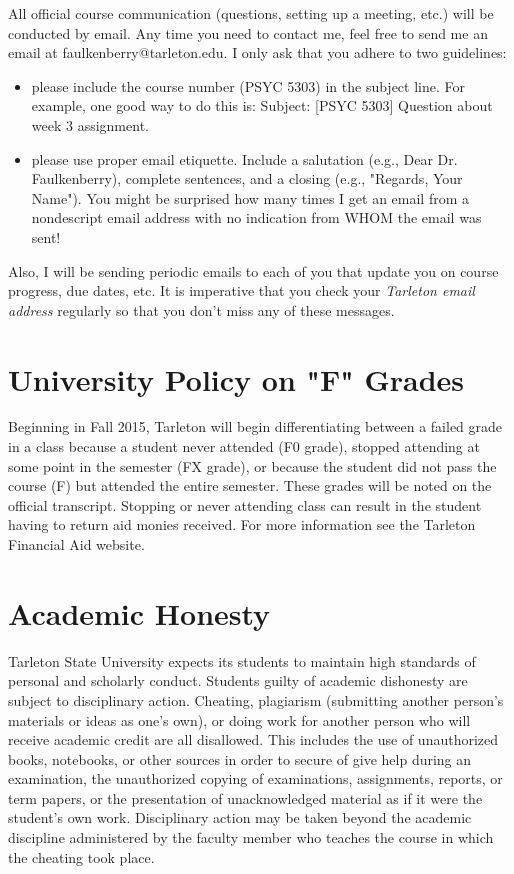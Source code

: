 \documentclass[10pt]{article}
\begin{document}
All official course communication (questions, setting up a meeting, etc.) will be conducted by email.  Any time you need to contact me, feel free to send me an email at faulkenberry@tarleton.edu.  I only ask that you adhere to two guidelines:
\begin{itemize}
\item please include the course number (PSYC 5303) in the subject line.  For example, one good way to do this is:  Subject: [PSYC 5303] Question about week 3 assignment.
\item please use proper email etiquette.  Include a salutation (e.g., Dear Dr. Faulkenberry), complete sentences, and a closing (e.g., "Regards, Your Name").  You might be surprised how many times I get an email from a nondescript email address with no indication from WHOM the email was sent!
\end{itemize}

Also, I will be sending periodic emails to each of you that update you on course progress, due dates, etc.  It is imperative that you check your \emph{Tarleton email address} regularly so that you don't miss any of these messages.

\section*{University Policy on "F" Grades}
\label{sec:org57f6cf6}
Beginning in Fall 2015, Tarleton will begin differentiating between a failed grade in a class because a student never attended (F0 grade), stopped attending at some point in the semester (FX grade), or because the student did not pass the course (F) but attended the entire semester. These grades will be noted on the official transcript. Stopping or never attending class can result in the student having to return aid monies received.  For more information see the Tarleton Financial Aid website.

\section*{Academic Honesty}
\label{sec:orgf339598}

Tarleton State University expects its students to maintain high standards of personal and scholarly conduct. Students guilty of academic dishonesty are subject to disciplinary action. Cheating, plagiarism (submitting another person’s materials or ideas as one’s own), or doing work for another person who will receive academic credit are all disallowed. This includes the use of unauthorized books, notebooks, or other sources in order to secure of give help during an examination, the unauthorized copying of examinations, assignments, reports, or term papers, or the presentation of unacknowledged material as if it were the student’s own work. Disciplinary action may be taken beyond the academic discipline administered by the faculty member who teaches the course in which the cheating took place.
\end{document}
